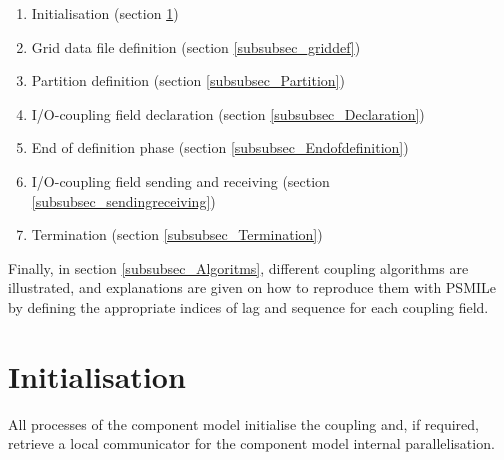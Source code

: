 \begin{enumerate}
\item Initialisation (section \ref{subsubsec_Initialisation})
\item Grid data file definition (section \ref{subsubsec_griddef})
\item Partition definition (section \ref{subsubsec_Partition})
\item I/O-coupling field declaration (section \ref{subsubsec_Declaration})
\item End of definition phase (section \ref{subsubsec_Endofdefinition})
\item I/O-coupling field sending and receiving (section
\ref{subsubsec_sendingreceiving})
\item Termination (section \ref{subsubsec_Termination})
\end{enumerate}

Finally, in section \ref{subsubsec_Algoritms}, different coupling
algorithms are illustrated, and explanations are given on how to
reproduce them with PSMILe by defining the appropriate indices of
lag and sequence for each coupling field.

\section{Initialisation}
\label{subsubsec_Initialisation}

All processes of the component model initialise the coupling and, if
required, retrieve a local communicator for the component model
internal parallelisation.

